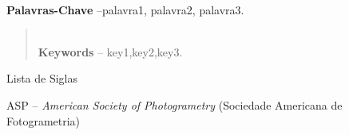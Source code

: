 \documentclass[]{politex}
\begin{document}
\capa
\falsafolhaderosto
\folhaderosto




\blindtext

\begin{agradecimentos}

\blindtext

\end{agradecimentos}




\begin{resumo}
\blindtext
%
\\[3\baselineskip]
%
\textbf{Palavras-Chave} --palavra1, palavra2, palavra3.
\end{resumo}

\begin{abstract}
\blindtext
%
\\[3\baselineskip]
%
\textbf{Keywords} -- key1,key2,key3.
\end{abstract}

\listadefiguras
\listadetabelas

\begin{pretextualsection}{Lista de Siglas}

\noindent
ASP – \textit{American Society of Photogrametry} (Sociedade Americana de Fotogrametria)\\ \\


\end{pretextualsection}

\sumario
\end{document}
